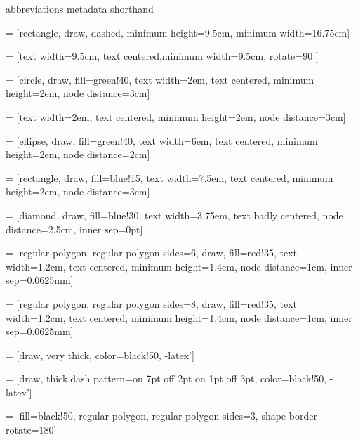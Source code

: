 \usepackage{adjustbox}
\usepackage{amsmath}
\usepackage{amssymb}
\usepackage{booktabs}
\usepackage{etoolbox}
\usepackage{graphicx}
\usepackage{import}
\usepackage{makecell} %
\usepackage{pifont}
\usepackage{stmaryrd} %
\usepackage{xfrac} %
\usepackage{xspace}

{abbreviations}
{metadata}
{shorthand}

\usepackage{tikz}
\usetikzlibrary{tikzmark}
\usetikzlibrary{shapes,arrows,positioning}

 = [rectangle, draw, dashed, minimum height=9.5cm, minimum width=16.75cm]

 = [text width=9.5cm, text centered,minimum width=9.5cm, rotate=90 ]

 = [circle, draw, fill=green!40, text width=2em, text centered, minimum height=2em, node distance=3cm]

 = [text width=2em, text centered, minimum height=2em, node distance=3cm]

 = [ellipse, draw, fill=green!40, text width=6em, text centered, minimum height=2em, node distance=2cm]

 = [rectangle, draw, fill=blue!15, text width=7.5em, text centered, minimum height=2em, node distance=3cm]

 = [diamond, draw, fill=blue!30, text width=3.75em, text badly centered, node distance=2.5cm, inner sep=0pt]

 = [regular polygon, regular polygon sides=6, draw, fill=red!35, text width=1.2cm, text centered, minimum height=1.4cm, node distance=1cm, inner sep=0.0625mm]

 = [regular polygon, regular polygon sides=8, draw, fill=red!35, text width=1.2cm, text centered, minimum height=1.4cm, node distance=1cm, inner sep=0.0625mm]

 = [draw, very thick, color=black!50, -latex']

 = [draw, thick,dash pattern={on 7pt off 2pt on 1pt off 3pt}, color=black!50, -latex']

 = [fill=black!50, regular polygon, regular polygon sides=3, shape border rotate=180]

